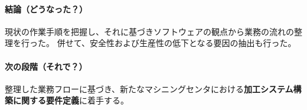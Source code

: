 {\paragraph*{結論（どうなった？）}
現状の作業手順を把握し、それに基づきソフトウェアの観点から業務の流れの整理を行った。
併せて、安全性および生産性の低下となる要因の抽出も行った。
\tcbline*
\paragraph*{次の段階（それで？）}
整理した業務フローに基づき、新たなマシニングセンタにおける\textbf{加工システム構築に関する要件定義}に着手する。
}





\begin{appendices}
\end{appendices}

